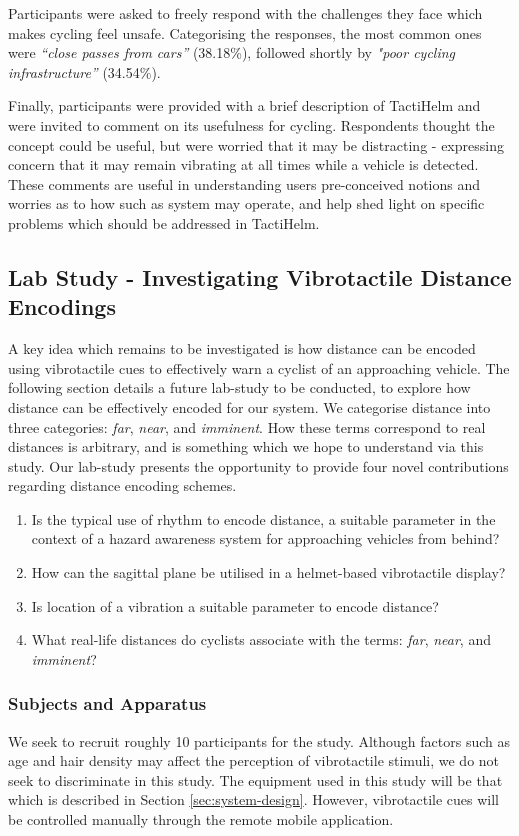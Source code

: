 \documentclass{interim}
\begin{document}
Participants were asked to freely respond with the challenges they face which makes cycling feel unsafe. Categorising the responses, the most common ones were \textit{“close passes from cars”} (38.18\%), followed shortly by \textit{"poor cycling infrastructure”} (34.54\%).

Finally, participants were provided with a brief description of TactiHelm and were invited to comment on its usefulness for cycling. Respondents thought the concept could be useful, but were worried that it may be distracting - expressing concern that it may remain vibrating at all times while a vehicle is detected. These comments are useful in understanding users pre-conceived notions and worries as to how such as system may operate, and help shed light on specific problems which should be addressed in TactiHelm.


\subsection{Lab Study - Investigating Vibrotactile Distance Encodings}\label{sec:lab-study}
A key idea which remains to be investigated is how distance can be encoded using vibrotactile cues to effectively warn a cyclist of an approaching vehicle. The following section details a future lab-study to be conducted, to explore how distance can be effectively encoded for our system. We categorise distance into three categories: \textit{far}, \textit{near}, and \textit{imminent}. How these terms correspond to real distances is arbitrary, and is something which we hope to understand via this study. Our lab-study presents the opportunity to provide four novel contributions regarding distance encoding schemes.
\begin{enumerate}
    \item Is the typical use of rhythm to encode distance, a suitable parameter in the context of a hazard awareness system for approaching vehicles from behind?
    \item How can the sagittal plane be utilised in a helmet-based vibrotactile display?
    \item Is location of a vibration a suitable parameter to encode distance?
    \item What real-life distances do cyclists associate with the terms: \textit{ far}, \textit{near}, and \textit{imminent}?
\end{enumerate}

\subsubsection{Subjects and Apparatus}
We seek to recruit roughly 10 participants for the study. Although factors such as age and hair density may affect the perception of vibrotactile stimuli, we do not seek to discriminate in this study.
The equipment used in this study will be that which is described in Section \ref{sec:system-design}. However, vibrotactile cues will be controlled manually through the remote mobile application.
\end{document}
